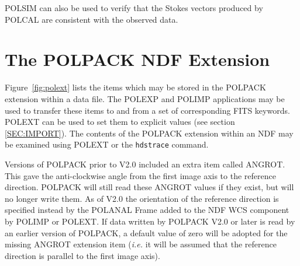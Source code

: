 \documentclass[twoside,11pt]{article}
\newcommand{\hyperref}[4]{#2\ref{#4}#3}
\newcommand{\htmlref}[2]{#1}
\newcommand{\xref}[3]{#1}
\newcommand{\xlabel}[1]{}
\renewcommand{\_}{\texttt{\symbol{95}}}
\begin{document}
POLSIM can also be used to verify that the Stokes vectors produced by
POLCAL are consistent with the observed data.

\section{\label{APP:POLEXT}\xlabel{thepolpackndfextension}The POLPACK NDF Extension}

Figure~\ref{fig:polext} lists the items which may be stored in the
POLPACK extension within a data file. The \htmlref{POLEXP}{POLEXP} and
\htmlref{POLIMP}{POLIMP} applications may be used to transfer these items
to and from a set of corresponding FITS keywords. \htmlref{POLEXT}{POLEXT} 
can be used to set them to explicit values (see \hyperref{here}{section }
{}{SEC:IMPORT}). The contents of the POLPACK extension within an NDF may be 
examined using POLEXT or the \xref{\texttt{hdstrace}}{sun102}{} command.

Versions of POLPACK prior to V2.0 included an extra item called ANGROT.
This gave the anti-clockwise angle from the first image axis to the
reference direction. POLPACK will still read these ANGROT values if they exist,
but will no longer write them. As of V2.0 the orientation of the reference
direction is specified instead by the POLANAL Frame added to the NDF WCS
component by POLIMP or POLEXT. If data written by POLPACK V2.0 or later 
is read by an earlier version of POLPACK, a default value of zero will be
adopted for the missing ANGROT extension item (\emph{i.e.} it will be
assumed that the reference direction is parallel to the first image axis).
\end{document}
